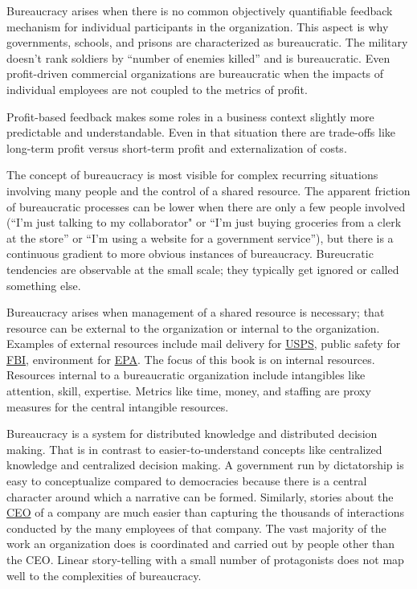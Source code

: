Bureaucracy arises when there is no common objectively quantifiable feedback mechanism for individual participants in the organization. This aspect is why governments, schools, and prisons are characterized as bureaucratic. The military doesn't rank soldiers by ``number of enemies killed'' and is bureaucratic. Even profit-driven commercial organizations are bureaucratic when the impacts of individual employees are not coupled to the metrics of profit. 

Profit-based feedback makes some roles in a business context slightly more predictable and understandable. Even in that situation there are trade-offs like long-term profit versus short-term profit and externalization of costs. 

The concept of bureaucracy is most visible for complex recurring situations involving many people and the control of a shared resource. The apparent friction of bureaucratic processes can be lower when there are only a few people involved (``I'm just talking to my collaborator" or ``I'm just buying groceries from a clerk at the store'' or ``I'm using a website for a government service''), but there is a continuous gradient to more obvious instances of bureaucracy. Bureucratic tendencies are observable at the small scale; they typically get ignored or called something else.

Bureaucracy arises when management of a shared resource is necessary; that resource can be external to the organization or internal to the organization. Examples of external resources include mail delivery for \href{https://en.wikipedia.org/wiki/United_States_Postal_Service}{USPS}, public safety for \href{https://en.wikipedia.org/wiki/Federal_Bureau_of_Investigation}{FBI}, environment for \href{https://en.wikipedia.org/wiki/United_States_Environmental_Protection_Agency}{EPA}. The focus of this book is on internal resources. Resources internal to a bureaucratic organization include intangibles like attention, skill, expertise. Metrics like time, money, and staffing are proxy measures for the central intangible resources.



Bureaucracy is a system for distributed knowledge and distributed decision making. That is in contrast to easier-to-understand concepts like centralized knowledge and centralized decision making. A government run by dictatorship is easy to conceptualize compared to democracies because there is a central character around which a narrative can be formed. Similarly, stories about the \href{https://en.wikipedia.org/wiki/Chief_executive_officer}{CEO} of a company are much easier than capturing the thousands of interactions conducted by the many employees of that company. The vast majority of the work an organization does is coordinated and carried out by people other than the CEO. Linear story-telling with a small number of protagonists does not map well to the complexities of bureaucracy. 


